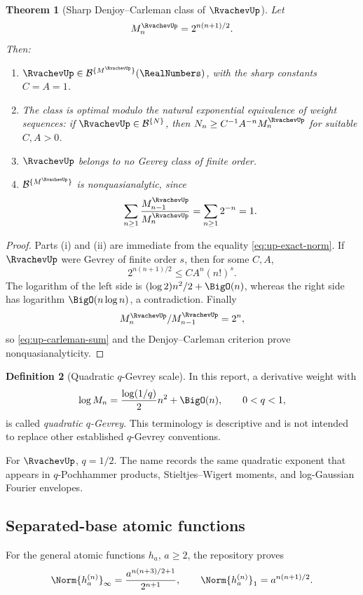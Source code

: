\documentclass[11pt]{article}
\numberwithin{equation}{section}
\newtheorem{theorem}{Theorem}[section]
\theoremstyle{definition}
\newtheorem{definition}[theorem]{Definition}
\begin{document}
\begin{theorem}[Sharp Denjoy--Carleman class of \(\RvachevUp\)]\label{thm:carleman-up}
Let
\begin{equation}\label{eq:Mup}
 M_n^{\RvachevUp}=2^{n(n+1)/2}.
\end{equation}
Then:
\begin{enumerate}[label=\textup{(\roman*)}]
\item \(\RvachevUp\in\mathcal B^{\{M^{\RvachevUp}\}}(\RealNumbers)\), with the sharp constants \(C=A=1\).
\item The class is optimal modulo the natural exponential equivalence of weight sequences: if \(\RvachevUp\in\mathcal B^{\{N\}}\), then \(N_n\ge C^{-1}A^{-n}M_n^{\RvachevUp}\) for suitable \(C,A>0\).
\item \(\RvachevUp\) belongs to no Gevrey class of finite order.
\item \(\mathcal B^{\{M^{\RvachevUp}\}}\) is nonquasianalytic, since
\begin{equation}\label{eq:up-carleman-sum}
 \sum_{n\ge1}\frac{M_{n-1}^{\RvachevUp}}{M_n^{\RvachevUp}}
 =\sum_{n\ge1}2^{-n}=1.
\end{equation}
\end{enumerate}
\end{theorem}

\begin{proof}
Parts (i) and (ii) are immediate from the equality \eqref{eq:up-exact-norm}.  If \(\RvachevUp\) were Gevrey of finite order \(s\), then for some \(C,A\),
\[
 2^{n(n+1)/2}\le CA^n(n!)^s.
\]
The logarithm of the left side is \((\log2)n^2/2+\BigO(n)\), whereas the right side has logarithm \(\BigO(n\log n)\), a contradiction.  Finally
\[
 M_n^{\RvachevUp}/M_{n-1}^{\RvachevUp}=2^n,
\]
so \eqref{eq:up-carleman-sum} and the Denjoy--Carleman criterion prove nonquasianalyticity.
\end{proof}

\begin{definition}[Quadratic \(q\)-Gevrey scale]
In this report, a derivative weight with
\[
 \log M_n=\frac{\log(1/q)}2n^2+\BigO(n),\qquad 0<q<1,
\]
is called \emph{quadratic \(q\)-Gevrey}.  This terminology is descriptive and is not intended to replace other established \(q\)-Gevrey conventions.
\end{definition}
For \(\RvachevUp\), \(q=1/2\).  The name records the same quadratic exponent that appears in \(q\)-Pochhammer products, Stieltjes--Wigert moments, and log-Gaussian Fourier envelopes.

\subsection{Separated-base atomic functions}
For the general atomic functions \(h_a\), \(a\ge2\), the repository proves \cite{RepoExponents}
\begin{equation}\label{eq:ha-exact-norm}
 \Norm{h_a^{(n)}}_\infty
 =\frac{a^{n(n+3)/2+1}}{2^{n+1}},
 \qquad
 \Norm{h_a^{(n)}}_1=a^{n(n+1)/2}.
\end{equation}
\end{document}

